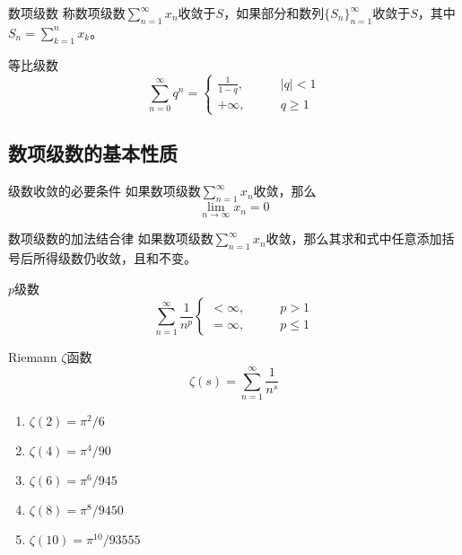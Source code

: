 \documentclass[lang = cn, scheme = chinese, thmcnt = section]{elegantbook}
\begin{document}
\begin{definition}{数项级数}
	称数项级数$\displaystyle \sum_{n=1}^{\infty}x_n$收敛于$S$，如果部分和数列$\{ S_n \}_{n=1}^{\infty}$收敛于$S$，其中$S_n=\displaystyle \sum_{k=1}^{n}x_k$。
\end{definition}

\begin{definition}{等比级数}
	$$
	\sum_{n=0}^{\infty}q^n=\begin{cases}
		\frac{1}{1-q},\qquad & |q|<1\\
		+\infty,\qquad & q\ge 1
	\end{cases}
	$$
\end{definition}

\subsection{数项级数的基本性质}

\begin{theorem}{级数收敛的必要条件}
	如果数项级数$\displaystyle \sum_{n=1}^{\infty}x_n$收敛，那么
	$$
	\lim_{n\to\infty}x_n=0
	$$
\end{theorem}

\begin{theorem}{数项级数的加法结合律}
	如果数项级数$\displaystyle \sum_{n=1}^{\infty}x_n$收敛，那么其求和式中任意添加括号后所得级数仍收敛，且和不变。
\end{theorem}

\begin{theorem}{$p$级数}
	$$
	\sum_{n=1}^{\infty}\frac{1}{n^p}\begin{cases}
		<\infty,\qquad & p>1\\
		=\infty,\qquad & p\le 1
	\end{cases}
	$$
\end{theorem}

\begin{definition}{Riemann $\zeta$函数}
	$$
	\zeta(s)=\sum_{n=1}^{\infty}\frac{1}{n^s}
	$$
	\begin{enumerate}
		\item $\zeta(2)=\pi^2/6$
		\item $\zeta(4)=\pi^4/90$
		\item $\zeta(6)=\pi^6/945$
		\item $\zeta(8)=\pi^8/9450$
		\item $\zeta(10)=\pi^{10}/93555$
	\end{enumerate}
\end{definition}
\end{document}

